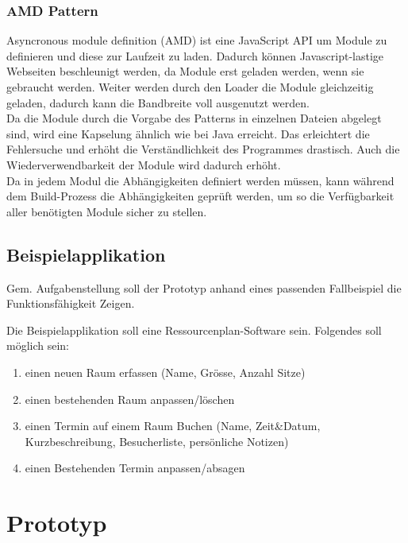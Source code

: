 \documentclass[oneside,11pt,parskip=half,ngerman]{scrreprt}
\begin{document}
\subsection{AMD Pattern}\label{amd-pattern}

Asyncronous module definition (AMD) ist eine JavaScript API um Module zu
definieren und diese zur Laufzeit zu laden. Dadurch können
Javascript-lastige Webseiten beschleunigt werden, da Module erst geladen
werden, wenn sie gebraucht werden. Weiter werden durch den Loader die
Module gleichzeitig geladen, dadurch kann die Bandbreite voll ausgenutzt
werden.\\Da die Module durch die Vorgabe des Patterns in einzelnen
Dateien abgelegt sind, wird eine Kapselung ähnlich wie bei Java
erreicht. Das erleichtert die Fehlersuche und erhöht die
Verständlichkeit des Programmes drastisch. Auch die Wiederverwendbarkeit
der Module wird dadurch erhöht.\\Da in jedem Modul die Abhängigkeiten
definiert werden müssen, kann während dem Build-Prozess die
Abhängigkeiten geprüft werden, um so die Verfügbarkeit aller benötigten
Module sicher zu stellen.

\section{Beispielapplikation}\label{beispielapplikation}

Gem. Aufgabenstellung soll der Prototyp anhand eines passenden
Fallbeispiel die Funktionsfähigkeit Zeigen.

Die Beispielapplikation soll eine Ressourcenplan-Software sein.
Folgendes soll möglich sein:

\begin{enumerate}
\def\labelenumi{\arabic{enumi}.}
\itemsep1pt\parskip0pt
\item
  einen neuen Raum erfassen (Name, Grösse, Anzahl Sitze)
\item
  einen bestehenden Raum anpassen/löschen
\item
  einen Termin auf einem Raum Buchen (Name, Zeit\&Datum,
  Kurzbeschreibung, Besucherliste, persönliche Notizen)
\item
  einen Bestehenden Termin anpassen/absagen
\end{enumerate}

\chapter{Prototyp}\label{prototyp}
\end{document}
